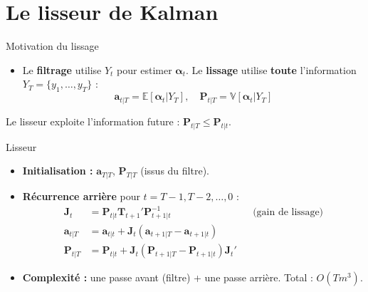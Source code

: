 \documentclass[11pt,aspectratio=169]{beamer}
\newcommand{\E}{\mathbb{E}}
\newcommand{\Var}{\mathbb{V}}
\begin{document}
\section{Le lisseur de Kalman}

\begin{frame}{Motivation du lissage}

\begin{itemize}

\item Le \textbf{filtrage} utilise $Y_t$ pour estimer $\bm{\alpha}_t$. Le \textbf{lissage} utilise \textbf{toute} l'information $Y_T = \{y_1, \ldots, y_T\}$ :
  \[
  \bm{a}_{t|T} = \E[\bm{\alpha}_t | Y_T], \quad \bm{P}_{t|T} = \Var[\bm{\alpha}_t | Y_T]
  \]

\end{itemize}

\begin{center}
\end{center}

Le lisseur exploite l'information future : $\bm{P}_{t|T} \leq \bm{P}_{t|t}$.

\end{frame}

\begin{frame}{Lisseur}

\begin{itemize}

\item \textbf{Initialisation :} $\bm{a}_{T|T}$, $\bm{P}_{T|T}$ (issus du filtre).\newline

\item \textbf{Récurrence arrière} pour $t = T-1, T-2, \ldots, 0$ :
  \begin{align*}
  \bm{J}_t &= \bm{P}_{t|t} \bm{T}_{t+1}' \bm{P}_{t+1|t}^{-1} & &\text{(gain de lissage)} \\
  \bm{a}_{t|T} &= \bm{a}_{t|t} + \bm{J}_t (\bm{a}_{t+1|T} - \bm{a}_{t+1|t}) \\
  \bm{P}_{t|T} &= \bm{P}_{t|t} + \bm{J}_t (\bm{P}_{t+1|T} - \bm{P}_{t+1|t}) \bm{J}_t'
  \end{align*}\newline

\item \textbf{Complexité :} une passe avant (filtre) + une passe arrière. Total : $O(Tm^3)$.

\end{itemize}

\end{frame}
\end{document}
